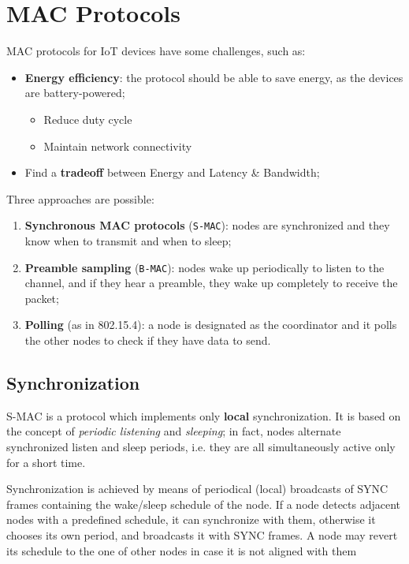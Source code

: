 \chapter{MAC Protocols}

MAC protocols for IoT devices have some challenges, such as:
\begin{itemize}
   \item \textbf{Energy efficiency}: the protocol should be able to save energy, as the devices are battery-powered;
   \begin{itemize}
      \item Reduce duty cycle
      \item Maintain network connectivity
   \end{itemize}
   \item Find a \textbf{tradeoff} between Energy and Latency \& Bandwidth;
\end{itemize}
Three approaches are possible:
\begin{enumerate}
   \item \textbf{Synchronous MAC protocols} (\texttt{S-MAC}): nodes are synchronized and they know when to transmit and when to sleep;
   \item \textbf{Preamble sampling} (\texttt{B-MAC}): nodes wake up periodically to listen to the channel, and if they hear a preamble, they wake up completely to receive the packet;
   \item \textbf{Polling} (as in 802.15.4): a node is designated as the coordinator and it polls the other nodes to check if they have data to send.
\end{enumerate}

\section{Synchronization}
S-MAC is a protocol which implements only \textbf{local} synchronization.
It is based on the concept of \textit{periodic listening} and \textit{sleeping}; in fact, nodes alternate synchronized listen and sleep periods, i.e. they are all simultaneously active only for a short time. 

Synchronization is achieved by means of periodical (local)
broadcasts of SYNC frames containing the wake/sleep schedule of the node.
If a node detects adjacent nodes with a predefined schedule, it can synchronize with them, otherwise it chooses its own period, and broadcasts it with SYNC frames.
A node may revert its schedule to the one of other nodes in case it is not aligned with them

